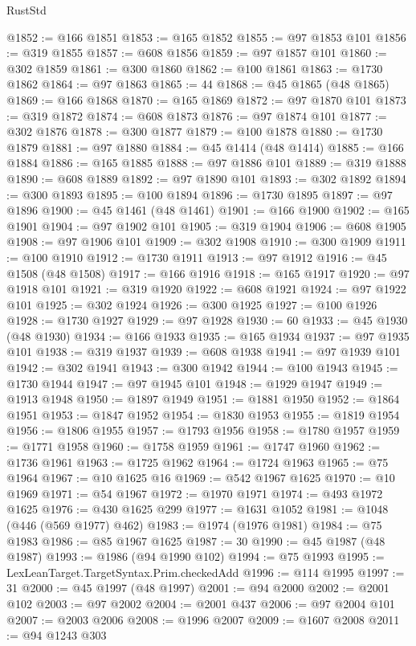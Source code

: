 \begin{lexlean}{RustStd}
\begin{coremodule}
@1852 := @166 @1851
@1853 := @165 @1852
@1855 := @97 @1853 @101
@1856 := @319 @1855
@1857 := @608 @1856
@1859 := @97 @1857 @101
@1860 := @302 @1859
@1861 := @300 @1860
@1862 := @100 @1861
@1863 := @1730 @1862
@1864 := @97 @1863
@1865 := 44
@1868 := @45 @1865 (@48 @1865)
@1869 := @166 @1868
@1870 := @165 @1869
@1872 := @97 @1870 @101
@1873 := @319 @1872
@1874 := @608 @1873
@1876 := @97 @1874 @101
@1877 := @302 @1876
@1878 := @300 @1877
@1879 := @100 @1878
@1880 := @1730 @1879
@1881 := @97 @1880
@1884 := @45 @1414 (@48 @1414)
@1885 := @166 @1884
@1886 := @165 @1885
@1888 := @97 @1886 @101
@1889 := @319 @1888
@1890 := @608 @1889
@1892 := @97 @1890 @101
@1893 := @302 @1892
@1894 := @300 @1893
@1895 := @100 @1894
@1896 := @1730 @1895
@1897 := @97 @1896
@1900 := @45 @1461 (@48 @1461)
@1901 := @166 @1900
@1902 := @165 @1901
@1904 := @97 @1902 @101
@1905 := @319 @1904
@1906 := @608 @1905
@1908 := @97 @1906 @101
@1909 := @302 @1908
@1910 := @300 @1909
@1911 := @100 @1910
@1912 := @1730 @1911
@1913 := @97 @1912
@1916 := @45 @1508 (@48 @1508)
@1917 := @166 @1916
@1918 := @165 @1917
@1920 := @97 @1918 @101
@1921 := @319 @1920
@1922 := @608 @1921
@1924 := @97 @1922 @101
@1925 := @302 @1924
@1926 := @300 @1925
@1927 := @100 @1926
@1928 := @1730 @1927
@1929 := @97 @1928
@1930 := 60
@1933 := @45 @1930 (@48 @1930)
@1934 := @166 @1933
@1935 := @165 @1934
@1937 := @97 @1935 @101
@1938 := @319 @1937
@1939 := @608 @1938
@1941 := @97 @1939 @101
@1942 := @302 @1941
@1943 := @300 @1942
@1944 := @100 @1943
@1945 := @1730 @1944
@1947 := @97 @1945 @101
@1948 := @1929 @1947
@1949 := @1913 @1948
@1950 := @1897 @1949
@1951 := @1881 @1950
@1952 := @1864 @1951
@1953 := @1847 @1952
@1954 := @1830 @1953
@1955 := @1819 @1954
@1956 := @1806 @1955
@1957 := @1793 @1956
@1958 := @1780 @1957
@1959 := @1771 @1958
@1960 := @1758 @1959
@1961 := @1747 @1960
@1962 := @1736 @1961
@1963 := @1725 @1962
@1964 := @1724 @1963
@1965 := @75 @1964
@1967 := @10 @1625 @16
@1969 := @542 @1967 @1625
@1970 := @10 @1969
@1971 := @54 @1967
@1972 := @1970 @1971
@1974 := @493 @1972 @1625
@1976 := @430 @1625 @299
@1977 := @1631 @1052
@1981 := @1048 (@446 (@569 @1977) @462)
@1983 := @1974 (@1976 @1981)
@1984 := @75 @1983
@1986 := @85 @1967 @1625
@1987 := 30
@1990 := @45 @1987 (@48 @1987)
@1993 := @1986 (@94 @1990 @102)
@1994 := @75 @1993
@1995 := LexLeanTarget.TargetSyntax.Prim.checkedAdd
@1996 := @114 @1995
@1997 := 31
@2000 := @45 @1997 (@48 @1997)
@2001 := @94 @2000
@2002 := @2001 @102
@2003 := @97 @2002
@2004 := @2001 @437
@2006 := @97 @2004 @101
@2007 := @2003 @2006
@2008 := @1996 @2007
@2009 := @1607 @2008
@2011 := @94 @1243 @303

\end{coremodule}
\end{lexlean}
